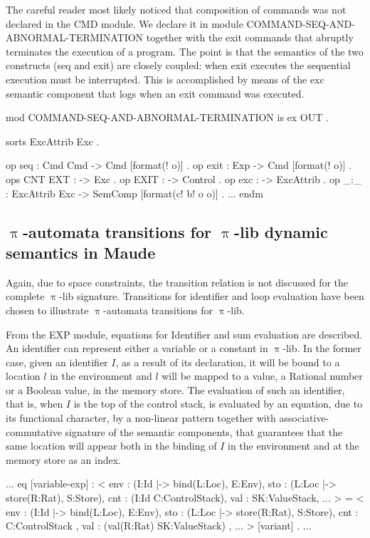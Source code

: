 \documentclass{llncs}%
\begin{document}
The careful reader most likely noticed that composition of commands was not declared in the CMD module. We declare it in module COMMAND-SEQ-AND-ABNORMAL-TERMINATION together with the exit commands that abruptly terminates the execution of a program. The point is that the semantics of the two constructs (seq and exit) are closely coupled: when exit executes the sequential execution must be interrupted. This is accomplished by means of the exc semantic component that logs when an exit command was executed. 
\begin{maude}[caption=Signature for $\uppi$-lib abnormal termination in Maude, label=lst:uppi-lib-ab-term-sig]
mod COMMAND-SEQ-AND-ABNORMAL-TERMINATION is
    ex OUT .

    sorts ExcAttrib Exc .
    
    op seq : Cmd Cmd -> Cmd [format(! o)] .
    op exit : Exp -> Cmd [format(! o)] .
    ops CNT EXT : -> Exc .
    op EXIT : -> Control .
    op exc : -> ExcAttrib .
    op _:_ : ExcAttrib Exc -> SemComp [format(c! b! o o)] .
    $\ldots$
endm
\end{maude}

\subsection{$\uppi$-automata transitions for $\uppi$-lib dynamic semantics in Maude}\label{sec:uppi-lib-gia}

Again, due to space constraints, the transition relation is not discussed for the complete $\uppi$-lib signature. Transitions for identifier and loop evaluation have been chosen to illustrate $\uppi$-automata transitions for $\uppi$-lib.

From the EXP module, equations for Identifier and sum evaluation are described. An identifier can represent either a variable or a constant in $\uppi$-lib. In the former case, given an identifier $I$, as a result of its declaration, it will be bound to a location $l$ in the environment and $l$ will be mapped to a value, a Rational number or a Boolean value, in the memory store. The evaluation of such an identifier, that is, when $I$ is the top of the control stack, is evaluated by an equation, due to its functional character, by a non-linear pattern together with associative-commutative signature of the semantic components, that guarantees that the same location will appear both in the binding of $I$ in the environment and at the memory store as an index.
\begin{maude}[caption=$\uppi$-automata equations for variable evaluation]
    $\ldots$
    eq [variable-exp] :
        < env : (I:Id |-> bind(L:Loc), E:Env),
          sto : (L:Loc |-> store(R:Rat), S:Store),
          cnt : (I:Id C:ControlStack), val : SK:ValueStack, ... > 
     =
        < env : (I:Id |-> bind(L:Loc), E:Env),
          sto : (L:Loc |-> store(R:Rat), S:Store),
          cnt : C:ControlStack ,
          val : (val(R:Rat) SK:ValueStack) , ... > [variant] .
    $\ldots$
\end{maude}
\end{document}
